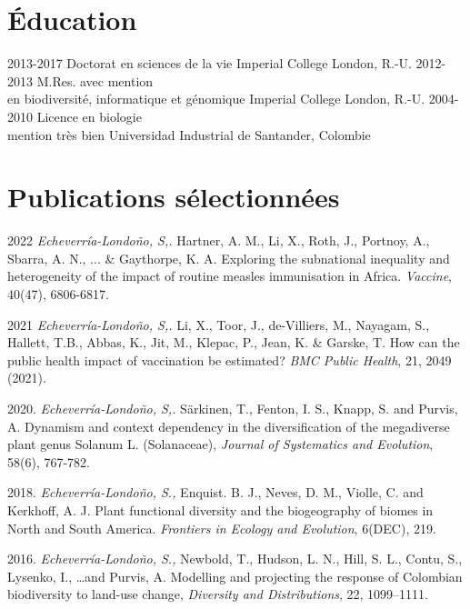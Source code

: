 \documentclass[icon]{twentysecondcv}
\begin{document}
\section{Éducation}

\begin{twenty}
  \twentyitem
    {2013-2017}
    {Doctorat  {\normalfont en sciences de la vie}}
    {Imperial College London, R.-U.}
    {}
  \twentyitem
    {2012-2013}
    {M.Res. avec mention  \\  {\normalfont en biodiversité, informatique et génomique}}
    {Imperial College London, R.-U.}
    {}
  \twentyitem
    {2004-2010}
    {Licence en biologie  \\  mention très bien}
    {Universidad Industrial de Santander, Colombie}
    {}
 \end{twenty}
 
 
\section{Publications sélectionnées}

\small 2022 \textit{Echeverr\'ia-Londo\~no, S,.}  Hartner, A. M., Li, X., Roth, J., Portnoy, A., Sbarra, A. N., ... \& Gaythorpe, K. A. Exploring the subnational inequality and heterogeneity of the impact of routine measles immunisation in Africa. \textit{Vaccine}, 40(47), 6806-6817. 

\small  2021 \textit{Echeverr\'ia-Londo\~no, S,.}  Li, X., Toor, J., de-Villiers, M., Nayagam, S., Hallett, T.B., Abbas, K., Jit, M., Klepac, P., Jean, K. \&  Garske, T. How can the public health impact of vaccination be estimated? \textit{BMC Public Health}, 21, 2049 (2021).

\small  2020. \textit{Echeverr\'ia-Londo\~no, S,.}  S{\"a}rkinen, T., Fenton, I. S., Knapp, S. and Purvis, A. Dynamism and context dependency in the diversification of the megadiverse plant genus Solanum L. (Solanaceae), \textit{Journal of Systematics and Evolution},  58(6), 767-782. 

\small  2018. \textit{Echeverr\'ia-Londo\~no, S.,} Enquist. B. J., Neves, D. M., Violle, C. and Kerkhoff, A. J. Plant functional diversity and the biogeography of biomes in North and South America. \textit{Frontiers in Ecology and Evolution}, 6(DEC), 219.

\small  2016. \textit{Echeverr\'ia-Londo\~no, S.,} Newbold, T., Hudson, L. N., Hill, S. L., Contu, S., Lysenko, I., \dots and Purvis, A. Modelling and projecting the response of Colombian biodiversity to land-use change, \textit{Diversity and Distributions}, 22, 1099--1111. 
\end{document}
